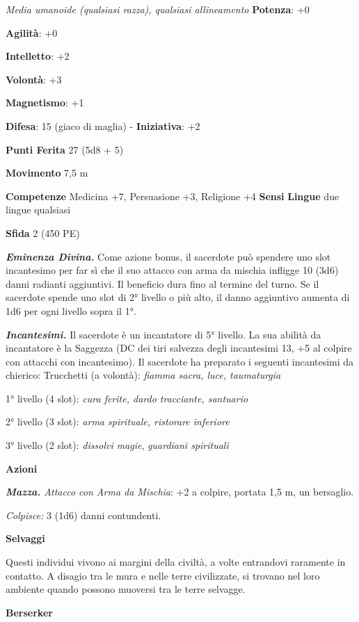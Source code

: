 \begin{multicols}{2}
\emph{Media umanoide (qualsiasi razza), qualsiasi allineamento}
\textbf{Potenza}: +0

\textbf{Agilità}: +0

\textbf{Intelletto}: +2

\textbf{Volontà}: +3

\textbf{Magnetismo}: +1

\textbf{Difesa}: 15 (giaco di maglia) - \textbf{Iniziativa}: +2

\textbf{Punti Ferita} 27 (5d8 + 5)

\textbf{Movimento} 7,5 m

\textbf{Competenze} Medicina +7, Persuasione +3, Religione +4
\textbf{Sensi}  \textbf{Lingue} due lingue
qualsiasi

\textbf{Sfida} 2 (450 PE)

\emph{\textbf{Eminenza Divina.}} Come azione bonus, il sacerdote può
spendere uno slot incantesimo per far sì che il suo attacco con arma da
mischia infligge 10 (3d6) danni radianti aggiuntivi. Il beneficio dura
fino al termine del turno. Se il sacerdote spende uno slot di 2° livello
o più alto, il danno aggiuntivo aumenta di 1d6 per ogni livello sopra il
1°.

\emph{\textbf{Incantesimi.}} Il sacerdote è un incantatore di 5°
livello. La sua abilità da incantatore è la Saggezza (DC dei tiri
salvezza degli incantesimi 13, +5 al colpire con attacchi con
incantesimo). Il sacerdote ha preparato i seguenti incantesimi da
chierico: Trucchetti (a volontà): \emph{fiamma sacra, luce, taumaturgia}

1° livello (4 slot): \emph{cura ferite, dardo tracciante, santuario}

2° livello (3 slot): \emph{arma spirituale, ristorare inferiore}

3° livello (2 slot): \emph{dissolvi magie}, \emph{guardiani spirituali}

\textbf{Azioni}

\emph{\textbf{Mazza.} Attacco con Arma da Mischia}: +2 a colpire,
portata 1,5 m, un bersaglio.

\emph{Colpisce:} 3 (1d6) danni contundenti.



\textbf{Selvaggi}

Questi individui vivono ai margini della civiltà, a volte entrandovi
raramente in contatto. A disagio tra le mura e nelle terre civilizzate,
si trovano nel loro ambiente quando possono muoversi tra le terre
selvagge.

\textbf{Berserker}


\end{multicols}
